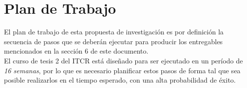 \section{\textbf{Plan de Trabajo}}
El plan de trabajo de esta propuesta de investigaci\'on es por definici\'on la secuencia de pasos que se deber\'an ejecutar para producir los entregables mencionados en la secci\'on 6 de este documento.\\
El curso de tesis 2 del ITCR est\'a dise\~nado para ser ejecutado en un per\'iodo de \textit{16 semanas}, por lo que es necesario planificar estos pasos de forma tal que sea posible realizarlos en el tiempo esperado, con una alta probabilidad de \'exito.